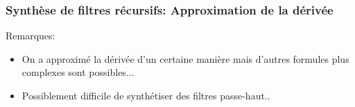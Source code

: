 \documentclass{beamer}
\begin{document}
\begin{frame}
{\begin{columns}
\begin{center}
\end{center}

\end{columns}

}

\end{frame}

\begin{frame}
\frametitle{Synthèse de filtres récursifs: Approximation de la dérivée}
Remarques:\\
\vspace{0.1cm}
\begin{itemize}
\item On a approximé la dérivée d'un certaine manière mais d'autres formules plus complexes sont possibles...
\item Possiblement difficile de synthétiser des filtres passe-haut.. 
\end{itemize}
\label{rajouter passe haut si le temps le permet}
\end{frame}
\end{document}
